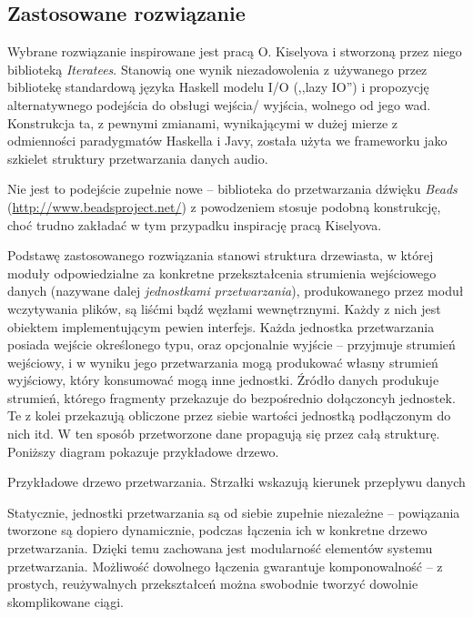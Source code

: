\subsection{Zastosowane rozwiązanie}

Wybrane rozwiązanie inspirowane jest pracą O. Kiselyova i stworzoną przez niego biblioteką
\emph{Iteratees}. Stanowią one wynik niezadowolenia z używanego przez bibliotekę standardową języka
Haskell modelu I/O (,,lazy IO'') i propozycję alternatywnego podejścia do obsługi wejścia\slash
wyjścia, wolnego od jego wad. Konstrukcja ta, z pewnymi zmianami, wynikającymi w dużej mierze z
odmienności paradygmatów Haskella i Javy, została użyta we frameworku jako szkielet struktury
przetwarzania danych audio.

\begin{Note}
  Nie jest to podejście zupełnie nowe -- biblioteka do przetwarzania dźwięku \emph{Beads}
  (\url{http://www.beadsproject.net/}) z powodzeniem stosuje podobną konstrukcję, choć trudno
  zakładać w tym przypadku inspirację pracą Kiselyova.
\end{Note}


Podstawę zastosowanego rozwiązania stanowi struktura drzewiasta, w której moduły odpowiedzialne za
konkretne przekształcenia strumienia wejściowego danych (nazywane dalej \emph{jednostkami
przetwarzania}), produkowanego przez moduł wczytywania plików, są liśćmi bądź węzłami wewnętrznymi.
Każdy z nich jest obiektem implementującym pewien interfejs.  Każda jednostka przetwarzania posiada
wejście określonego typu, oraz opcjonalnie wyjście -- przyjmuje strumień wejściowy, i w wyniku jego
przetwarzania mogą produkować własny strumień wyjściowy, który konsumować mogą inne jednostki.
Źródło danych produkuje strumień, którego fragmenty przekazuje do bezpośrednio dołączoncyh
jednostek. Te z kolei przekazują obliczone przez siebie wartości jednostką podłączonym do nich itd.
W ten sposób przetworzone dane propagują się przez całą strukturę. Poniższy diagram pokazuje
przykładowe drzewo.


{Przykładowe drzewo przetwarzania. Strzałki wskazują kierunek przepływu danych}


Statycznie, jednostki przetwarzania są od siebie zupełnie niezależne -- powiązania tworzone są
dopiero dynamicznie, podczas łączenia ich w konkretne drzewo przetwarzania. Dzięki temu zachowana
jest modularność elementów systemu przetwarzania. Możliwość dowolnego łączenia gwarantuje
komponowalność -- z prostych, reużywalnych przekształceń można swobodnie tworzyć dowolnie
skomplikowane ciągi.

